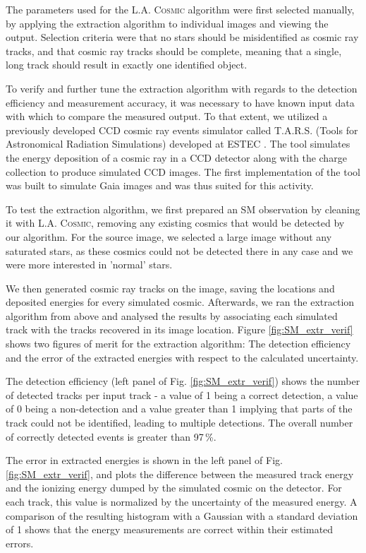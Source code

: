 \documentclass[a4paper, 11pt]{article}
\begin{document}
The parameters used for the \textsc{L.A. Cosmic} algorithm were first selected manually, by applying the extraction algorithm to individual images and viewing the output. Selection criteria were that no stars should be misidentified as cosmic ray tracks, and that cosmic ray tracks should be complete, meaning that a single, long track should result in exactly one identified object.

To verify and further tune the extraction algorithm with regards to the detection efficiency and measurement accuracy, it was necessary to have known input data with which to compare the measured output. To that extent, we utilized a previously developed CCD cosmic ray events simulator called T.A.R.S. (Tools for Astronomical Radiation Simulations) developed at ESTEC \cite{TARS}. The tool simulates the energy deposition of a cosmic ray in a CCD detector along with the charge collection to produce simulated CCD images. The first implementation of the tool was built to simulate Gaia images and was thus suited for this activity.

To test the extraction algorithm, we first prepared an SM observation by cleaning it with \textsc{L.A. Cosmic}, removing any existing cosmics that would be detected by our algorithm. For the source image, we selected a large image without any saturated stars, as these cosmics could not be detected there in any case and we were more interested in 'normal' stars.

We then generated cosmic ray tracks on the image, saving the locations and deposited energies for every simulated cosmic. Afterwards, we ran the extraction algorithm from above and analysed the results by associating each simulated track with the tracks recovered in its image location. Figure \ref{fig:SM_extr_verif} shows two figures of merit for the extraction algorithm: The detection efficiency and the error of the extracted energies with respect to the calculated uncertainty.

The detection efficiency (left panel of Fig. \ref{fig:SM_extr_verif}) shows the number of detected tracks per input track - a value of 1 being a correct detection, a value of 0 being a non-detection and a value greater than 1 implying that parts of the track could not be identified, leading to multiple detections. The overall number of correctly detected events is greater than 97\,\%.

The error in extracted energies is shown in the left panel of Fig. \ref{fig:SM_extr_verif}, and plots the difference between the measured track energy and the ionizing energy dumped by the simulated cosmic on the detector. For each track, this value is normalized by the uncertainty of the measured energy. A comparison of the resulting histogram with a Gaussian with a standard deviation of 1 shows that the energy measurements are correct within their estimated errors.
\end{document}
